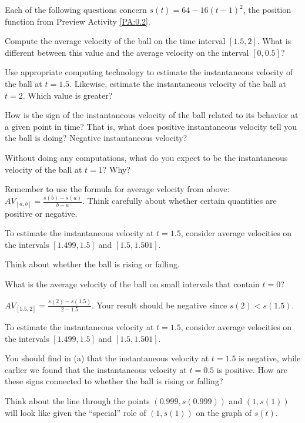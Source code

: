 \begin{activity}  \label{A:0.2.2}
Each of the following questions concern  $s(t) = 64 - 16(t-1)^2$, the position function from Preview Activity \ref{PA:0.2}.
\ba
	\item Compute the average velocity of the ball on the time interval $[1.5,2]$.  What is different between this value and the average velocity on the interval $[0,0.5]$?
	\item Use appropriate computing technology to estimate the instantaneous velocity of the ball at $t = 1.5$.  Likewise, estimate the instantaneous velocity of the ball at $t = 2$.  Which value is greater?
	\item How is the sign of the instantaneous velocity of the ball related to its behavior at a given point in time?  That is, what does positive instantaneous velocity tell you the ball is doing?  Negative instantaneous velocity?
	\item Without doing any computations, what do you expect to be the instantaneous velocity of the ball at $t = 1$?  Why?
\ea
\end{activity}
\begin{smallhint}
\ba
	\item Remember to use the formula for average velocity from above:  $AV_{[a,b]} = \frac{s(b)-s(a)}{b-a}$.  Think carefully about whether certain quantities are positive or negative.
	\item To estimate the instantaneous velocity at $t = 1.5$, consider average velocities on the intervals $[1.499,1.5]$ and $[1.5,1.501]$.
	\item Think about whether the ball is rising or falling.
	\item What is the average velocity of the ball on small intervals that contain $t = 0$?
\ea
\end{smallhint}
\begin{bighint}
\ba
	\item $AV_{[1.5,2]} = \frac{s(2)-s(1.5)}{2-1.5}$.  Your result should be negative since $s(2) < s(1.5)$.
	\item To estimate the instantaneous velocity at $t = 1.5$, consider average velocities on the intervals $[1.499,1.5]$ and $[1.5,1.501]$.
	\item You should find in (a) that the instantaneous velocity at $t = 1.5$ is negative, while earlier we found that the instantaneous velocity at $t = 0.5$ is positive.  How are these signs connected to whether the ball is rising or falling?
	\item Think about the line through the points $(0.999,s(0.999))$ and $(1,s(1))$ will look like given the ``special'' role of $(1,s(1))$ on the graph of $s(t)$.
\ea
\end{bighint}

